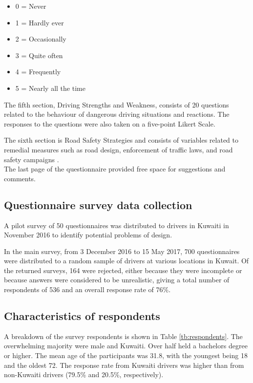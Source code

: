 \documentclass[preprint,12pt,a4paper,authoryear]{elsarticle}
\begin{document}
\begin{itemize}
\item{0 = Never}
\item{1 = Hardly ever}
\item{2 = Occasionally}
\item{3 = Quite often}
\item{4 = Frequently}
\item{5 = Nearly all the time}
\end{itemize} 

The fifth section, Driving Strengths and Weakness, consists of 20 questions related to the behaviour of dangerous driving situations and reactions. The responses to the questions were also taken on a five-point Likert Scale.

The sixth section is Road Safety Strategies and consists of variables related to remedial measures such as road design, enforcement of traffic laws, and road safety campaigns .\\

The last page of the questionnaire provided free space for suggestions and comments. \\

\subsection{Questionnaire survey data collection}

A pilot survey of 50 questionnaires was distributed to drivers in Kuwaiti in November 2016 to identify potential problems of design. 

In the main survey, from 3 December 2016 to 15 May 2017, 700 questionnaires were distributed to a random sample of drivers at various locations in Kuwait.  Of the returned surveys, 164  were rejected, either because they were incomplete or because answers were considered to be unrealistic, giving a total number of respondents of 536 and an overall response rate of 76\%. 
        
\subsection{Characteristics of respondents}

A breakdown of the survey respondents is shown in Table \ref{tb:respondents}.  The overwhelming majority were male and Kuwaiti. Over half held a bachelors degree or higher.  The mean age of the participants was 31.8, with the youngest being 18 and the oldest 72. The response rate from Kuwaiti drivers was higher than from non-Kuwaiti drivers (79.5\% and 20.5\%, respectively). 
\end{document}
